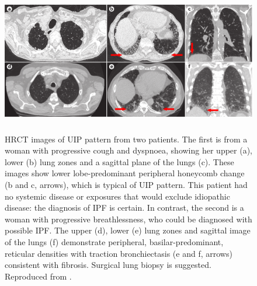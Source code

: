 \begin{figure}[H]
  \centering 
  \includegraphics[height=2.5in]{Background/Image/RadiologicalImaging.png}
  \caption{HRCT images of UIP pattern from two patients. The first is from a woman with progressive cough and dyspnoea, showing her upper (a), lower (b) lung zones and a sagittal plane of the lungs (c). These images show lower lobe-predominant peripheral honeycomb change (b and c, arrows), which is typical of UIP pattern. This patient had no systemic disease or exposures that would exclude idiopathic disease: the diagnosis of IPF is certain. In contrast, the second is a woman with progressive breathlessness, who could be diagnosed with possible IPF. The upper (d), lower (e) lung zones and sagittal image of the lungs (f) demonstrate peripheral, basilar-predominant, reticular densities with traction bronchiectasis (e and f, arrows) consistent with fibrosis. Surgical lung biopsy is suggested. Reproduced from \citep{martinez2017idiopathic}.}
  \label{fig:RadiologicalImaging}
\end{figure}


